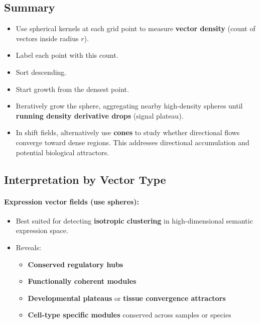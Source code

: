     \subsection{Summary}
        \begin{itemize}
            \item Use spherical kernels at each grid point to measure \textbf{vector density} (count of vectors inside radius $r$).
            \item Label each point with this count.
            \item Sort descending.
            \item Start growth from the densest point.
            \item Iteratively grow the sphere, aggregating nearby high-density spheres until \textbf{running density derivative drops} (signal plateau).
            \item In shift fields, alternatively use \textbf{cones} to study whether directional flows converge toward dense regions. This addresses directional accumulation and potential biological attractors.
        \end{itemize}

    \subsection{Interpretation by Vector Type}
        \paragraph{Expression vector fields (use spheres):}
        \begin{itemize}
            \item Best suited for detecting \textbf{isotropic clustering} in high-dimensional semantic expression space.
            \item Reveals:
                  \begin{itemize}
                      \item \textbf{Conserved regulatory hubs}
                      \item \textbf{Functionally coherent modules}
                      \item \textbf{Developmental plateaus} or \textbf{tissue convergence attractors}
                      \item \textbf{Cell-type specific modules} conserved across samples or species
                  \end{itemize}
        \end{itemize}

